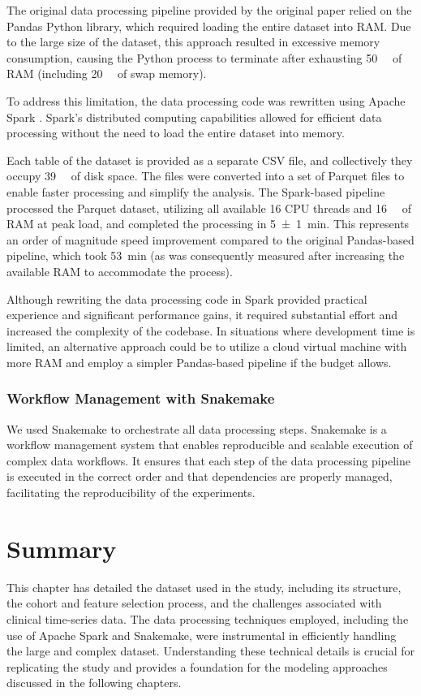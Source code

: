 The original data processing pipeline provided by the original paper relied on the Pandas Python library, which required loading the entire dataset into RAM. Due to the large size of the dataset, this approach resulted in excessive memory consumption, causing the Python process to terminate after exhausting \qty{50}{\giga\byte} of RAM (including \qty{20}{\giga\byte} of swap memory).

To address this limitation, the data processing code was rewritten using Apache Spark \cite{ApacheSpark}. Spark's distributed computing capabilities allowed for efficient data processing without the need to load the entire dataset into memory.

Each table of the dataset is provided as a separate CSV file, and collectively they occupy  \qty{39}{\giga\byte} of disk space. The files were converted into a set of Parquet files to enable faster processing and simplify the analysis. The Spark-based pipeline processed the Parquet dataset, utilizing all available \num{16} CPU threads and \qty{16}{\giga\byte} of RAM at peak load, and completed the processing in \qty{5(1)}{\minute}. This represents an order of magnitude speed improvement compared to the original Pandas-based pipeline, which took \qty{53}{\minute} (as was consequently measured after increasing the available RAM to accommodate the process).

Although rewriting the data processing code in Spark provided practical experience and significant performance gains, it required substantial effort and increased the complexity of the codebase. In situations where development time is limited, an alternative approach could be to utilize a cloud virtual machine with more RAM and employ a simpler Pandas-based pipeline if the budget allows.

\subsubsection{Workflow Management with Snakemake}

We used Snakemake to orchestrate all data processing steps. Snakemake is a workflow management system that enables reproducible and scalable execution of complex data workflows. It ensures that each step of the data processing pipeline is executed in the correct order and that dependencies are properly managed, facilitating the reproducibility of the experiments.

\section{Summary}

This chapter has detailed the dataset used in the study, including its structure, the cohort and feature selection process, and the challenges associated with clinical time-series data. The data processing techniques employed, including the use of Apache Spark and Snakemake, were instrumental in efficiently handling the large and complex dataset. Understanding these technical details is crucial for replicating the study and provides a foundation for the modeling approaches discussed in the following chapters.

